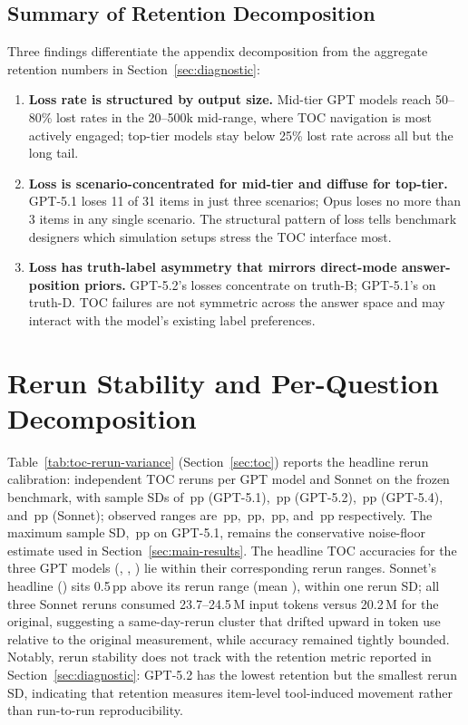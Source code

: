 \documentclass{article}
\begin{document}
\subsection{Summary of Retention Decomposition}

Three findings differentiate the appendix decomposition from the aggregate retention numbers in Section~\ref{sec:diagnostic}:

\begin{enumerate}[leftmargin=*, itemsep=2pt]
    \item \textbf{Loss rate is structured by output size.} Mid-tier GPT models reach 50--80\% lost rates in the 20--500k mid-range, where TOC navigation is most actively engaged; top-tier models stay below 25\% lost rate across all but the long tail.
    \item \textbf{Loss is scenario-concentrated for mid-tier and diffuse for top-tier.} GPT-5.1 loses 11 of 31 items in just three scenarios; Opus loses no more than 3 items in any single scenario. The structural pattern of loss tells benchmark designers which simulation setups stress the TOC interface most.
    \item \textbf{Loss has truth-label asymmetry that mirrors direct-mode answer-position priors.} GPT-5.2's losses concentrate on truth-B; GPT-5.1's on truth-D. TOC failures are not symmetric across the answer space and may interact with the model's existing label preferences.
\end{enumerate}

\section{Rerun Stability and Per-Question Decomposition}
\label{sec:appendix-stability}

Table~\ref{tab:toc-rerun-variance} (Section~\ref{sec:toc}) reports the headline rerun calibration: \TOCRerunNumSamples{} independent TOC reruns per GPT model and Sonnet on the frozen benchmark, with sample SDs of \GPTFiveOneTOCRerunSD\,pp (GPT-5.1), \GPTFiveTwoTOCRerunSD\,pp (GPT-5.2), \GPTFiveFourTOCRerunSD\,pp (GPT-5.4), and \SonnetTOCRerunSD\,pp (Sonnet); observed ranges are \GPTFiveOneTOCRerunRange\,pp, \GPTFiveTwoTOCRerunRange\,pp, \GPTFiveFourTOCRerunRange\,pp, and \SonnetTOCRerunRange\,pp respectively. The maximum sample SD, \TOCRerunMaxSD\,pp on GPT-5.1, remains the conservative noise-floor estimate used in Section~\ref{sec:main-results}. The headline TOC accuracies for the three GPT models (\GPTFiveOneTOC{}, \GPTFiveTwoTOC{}, \GPTFiveFourTOC{}) lie within their corresponding rerun ranges. Sonnet's headline (\SonnetTOC) sits 0.5\,pp above its rerun range (mean \SonnetTOCRerunMean), within one rerun SD; all three Sonnet reruns consumed 23.7--24.5\,M input tokens versus 20.2\,M for the original, suggesting a same-day-rerun cluster that drifted upward in token use relative to the original measurement, while accuracy remained tightly bounded. Notably, rerun stability does not track with the retention metric reported in Section~\ref{sec:diagnostic}: GPT-5.2 has the lowest retention but the smallest rerun SD, indicating that retention measures item-level tool-induced movement rather than run-to-run reproducibility.
\end{document}
